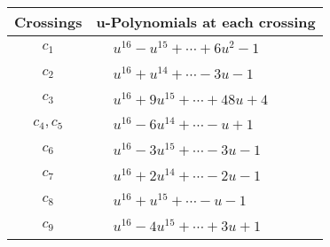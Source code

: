 \documentclass[1p]{elsarticle_modified}
\theoremstyle{definition}
\begin{document}
\begin{tabular}{m{50pt}|m{274pt}}
Crossings & \hspace{64pt}u-Polynomials at each crossing \\
\hline $$\begin{aligned}c_{1}\end{aligned}$$&$\begin{aligned}
&u^{16}- u^{15}+\cdots+6 u^2-1
\end{aligned}$\\
\hline $$\begin{aligned}c_{2}\end{aligned}$$&$\begin{aligned}
&u^{16}+u^{14}+\cdots-3 u-1
\end{aligned}$\\
\hline $$\begin{aligned}c_{3}\end{aligned}$$&$\begin{aligned}
&u^{16}+9 u^{15}+\cdots+48 u+4
\end{aligned}$\\
\hline $$\begin{aligned}c_{4},c_{5}\end{aligned}$$&$\begin{aligned}
&u^{16}-6 u^{14}+\cdots- u+1
\end{aligned}$\\
\hline $$\begin{aligned}c_{6}\end{aligned}$$&$\begin{aligned}
&u^{16}-3 u^{15}+\cdots-3 u-1
\end{aligned}$\\
\hline $$\begin{aligned}c_{7}\end{aligned}$$&$\begin{aligned}
&u^{16}+2 u^{14}+\cdots-2 u-1
\end{aligned}$\\
\hline $$\begin{aligned}c_{8}\end{aligned}$$&$\begin{aligned}
&u^{16}+u^{15}+\cdots- u-1
\end{aligned}$\\
\hline $$\begin{aligned}c_{9}\end{aligned}$$&$\begin{aligned}
&u^{16}-4 u^{15}+\cdots+3 u+1
\end{aligned}$\\

\end{tabular}
\end{document}
